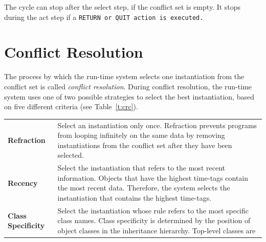 The cycle can stop after the select step, if the conflict set is
empty. It stops during the act step if a \tt{RETURN} or \tt{QUIT}
action is executed.

\section{Conflict Resolution}

The process by which the run-time system selects one instantiation
from the conflict set is called \emph{conflict resolution}. During
conflict resolution, the run-time system uses one of two possible
strategies to select the best instantiation, based on five different
criteria (see Table~\ref{t:crc}).

\begin{table}[h]
  \def\arraystretch{1.2}
  \begin{tabularx}{\columnwidth}{lX}
    \toprule
    \textbf{Refraction}   & Select an instantiation 
                            only once.               
                            Refraction prevents       
                            programs from looping    
                            infinitely on the same   
                            data by removing         
                            instantiations from the 
                            conflict set after they 
                            have been selected.  \\
    \textbf{Recency}      & Select the instantiation 
                            that refers to the most  
                            recent information.      
                            Objects that have the    
                            highest time-tags contain
                            the most recent data.    
                            Therefore, the system    
                            selects the instantiation 
                            that contains the highest
                            time-tags.              \\
    \textbf{Class Specificity} & Select the instantiation 
                                 whose rule refers to the 
                                 most specific class      
                                 names.                   
                                 Class specificity is     
                                 determined by the        
                                 position of object       
                                 classes in the           
                                 inheritance hierarchy.  
                                 Top-level classes are    

\end{tabularx}
\end{table}
